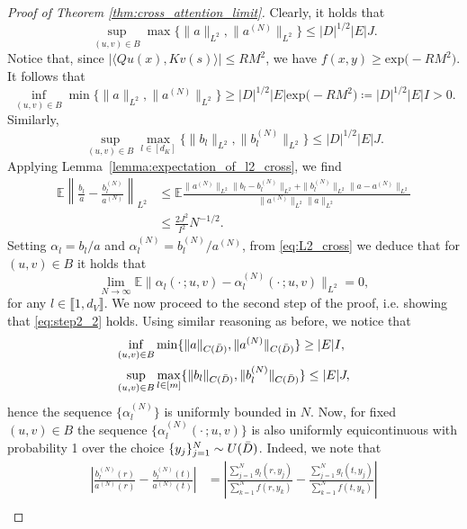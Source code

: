 \documentclass[twoside]{article}
\newcommand{\1}{\mathbbm{1}}
\newcommand{\range}[2]{\llbracket #1, #2 \rrbracket}
\newcommand{\E}{\mathbb{E}}
\begin{document}
\begin{proof}[Proof of Theorem \ref{thm:cross_attention_limit}]
Clearly, it holds that
\[\sup_{(u,v) \in B} \max \{ \|a\|_{L^2}, \|a^{(N)}\|_{L^2} \} \leq |D|^{1/2}|E| J.\]
Notice that, since \(|\langle Q u(x), K v(s) \rangle| \leq RM^2\), we have \(f(x,y) \geq \text{exp} \big ( - R M^2 \big )\).
It follows that
\[\inf_{(u,v) \in B} \min \{ \|a\|_{L^2}, \|a^{(N)}\|_{L^2} \} \geq |D|^{1/2}|E| \text{exp} \big ( - R M^2 \big ) \coloneqq |D|^{1/2}|E| I > 0.\]
Similarly, 
\[\sup_{(u,v) \in B} \max_{l \in [d_K]} \{ \|b_l\|_{L^2}, \|b_l^{(N)}\|_{L^2} \} \leq |D|^{1/2}|E| J.\]
Applying Lemma~\ref{lemma:expectation_of_l2_cross}, we find
\begin{subequations}
\begin{align}
\label{eq:L2_cross}
\E \left \| \frac{b_l}{a} - \frac{b_l^{(N)}}{a^{(N)}} \right \|_{L^2} &\leq \E \frac{\|a^{(N)}\|_{L^2} \|b_l - b_l^{(N)}\|_{L^2} + \|b_l^{(N)}\|_{L^2} \|a - a^{(N)}\|_{L^2}  }{\|a^{(N)}\|_{L^2} \|a\|_{L^2}} \\
&\leq \frac{2 J^2}{I^2} N^{-1/2}.
\end{align}
\end{subequations}
Setting \(\alpha_l = b_l/a\) and \(\alpha_l^{(N)} = b_l^{(N)}/a^{(N)}\), from \eqref{eq:L2_cross} we deduce that for $(u,v)\in B$ it holds that
\begin{equation}
    \lim_{N \to \infty} \E \|\alpha_l(\cdot\,;u,v) - \alpha_l^{(N)}(\cdot\,;u,v)\|_{L^2} = 0,
\end{equation}
for any $l\in\range{1}{d_V}$. We now proceed to the second step of the proof, i.e. showing that \eqref{eq:step2_2} holds. Using similar reasoning as before, we notice that 
\begin{subequations}
\begin{align}
\inf_{(u,v) \in B}& \min \{ \|a\|_{C(\Bar{D})}, \|a^{(N)}\|_{C(\Bar{D})} \} \geq |E|I,\\
\sup_{(u,v) \in B} &\max_{l \in [m]} \{ \|b_l\|_{C(\Bar{D})}, \|b_l^{(N)}\|_{C(\Bar{D})} \} \leq |E| J,
\end{align}
\end{subequations}
hence the sequence \( \{\alpha_l^{(N)}\}\) is uniformly bounded in $N$. Now, for fixed $(u,v)\in B$ the sequence \( \{\alpha_l^{(N)}(\cdot\,;u,v)\}\) is also uniformly equicontinuous with probability 1 over the choice \(\{y_j\}_{j=1}^N \sim U(\Bar{D})\). Indeed, we note that
    \begin{subequations}
        \begin{align}
            \left| \frac{b_l^{(N)}(r)}{a^{(N)}(r)}- \frac{b_l^{(N)}(t)}{a^{(N)}(t)}\right| &= \left| \frac{\sum_{j=1}^N g_l(r,y_j)}{\sum_{k=1}^N f(r,y_k)} - \frac{\sum_{j=1}^N g_l(t,y_j)}{\sum_{k=1}^N f(t,y_k)}\right|\\

\end{align}
\end{subequations}
\end{proof}
\end{document}
